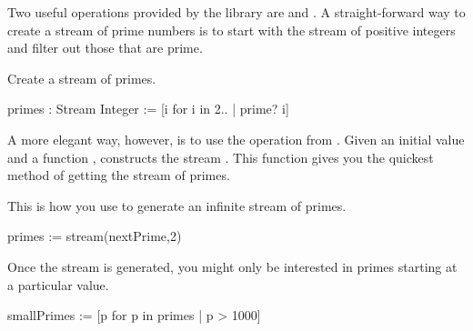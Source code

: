 {Two useful operations provided by the \Language{} library are
 and
.
A straight-forward way to create a stream of
prime numbers is to start with the stream of positive integers \spad{[2,..]} and
filter out those that are prime.
\begin{xtc}
\begin{xtccomment}
Create a stream of primes.
\end{xtccomment}
\begin{spadsrc}
primes : Stream Integer := [i for i in 2.. | prime? i]
\end{spadsrc}
\begin{TeXOutput}
\begin{fricasmath}{1}
%
\end{fricasmath}
\end{TeXOutput}
\end{xtc}
A more elegant way, however, is to use the 
operation from .
Given an initial value  and a function ,
constructs the stream \spad{[a, f(a), f(f(a)), ...]}.
This function gives you the quickest method of getting the stream of primes.
\begin{xtc}
\begin{xtccomment}
This is how you use
 to
generate an infinite stream of primes.
\end{xtccomment}
\begin{spadsrc}
primes := stream(nextPrime,2)
\end{spadsrc}
\begin{TeXOutput}
\begin{fricasmath}{2}
%
\end{fricasmath}
\end{TeXOutput}
\end{xtc}
\begin{xtc}
\begin{xtccomment}
Once the stream is generated, you might only be interested in
primes starting at a particular value.
\end{xtccomment}
\begin{spadsrc}
smallPrimes := [p for p in primes | p > 1000] 
\end{spadsrc}

\end{xtc}}

